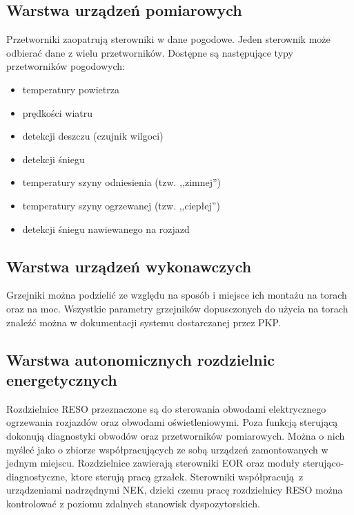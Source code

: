 \subsection{Warstwa urządzeń pomiarowych}
Przetworniki zaopatrują sterowniki w dane pogodowe. Jeden sterownik może odbierać dane z wielu przetworników. Dostępne są następujące typy przetworników pogodowych:
\begin{itemize}
\item temperatury powietrza
\item prędkości wiatru
\item detekcji deszczu (czujnik wilgoci)
\item detekcji śniegu
\item temperatury szyny odniesienia (tzw. ,,zimnej'')
\item temperatury szyny ogrzewanej (tzw. ,,ciepłej'')
\item detekcji śniegu nawiewanego na rozjazd
\end{itemize}

\subsection{Warstwa urządzeń wykonawczych}
Grzejniki można podzielić ze względu na sposób i miejsce ich montażu na torach oraz na moc. Wszystkie parametry grzejników dopusczonych do użycia na torach znaleźć można w dokumentacji systemu dostarczanej przez PKP.



\subsection{Warstwa autonomicznych rozdzielnic energetycznych}
Rozdzielnice RESO przeznaczone są do sterowania obwodami elektrycznego ogrzewania rozjazdów oraz obwodami oświetleniowymi. Poza funkcją sterującą dokonują diagnostyki obwodów oraz przetworników pomiarowych. Można o nich myśleć jako o zbiorze współpracujących ze sobą urządzeń zamontowanych w jednym miejscu. Rozdzielnice zawierają sterowniki EOR oraz moduły sterująco-diagnostyczne, ktore sterują pracą grzałek. Sterowniki współpracują z urządzeniami nadrzędnymi NEK, dzieki czemu pracę rozdzielnicy RESO można kontrolować z poziomu zdalnych stanowisk dyspozytorskich.

